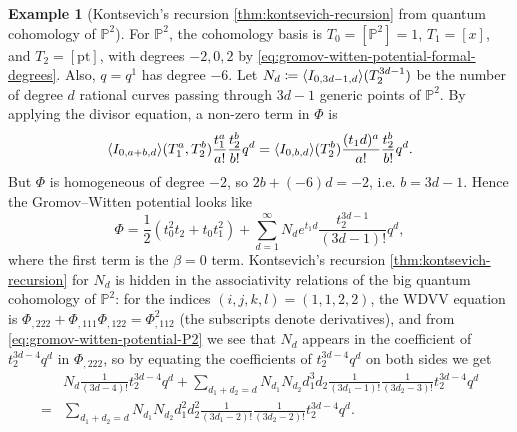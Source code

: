 \documentclass{report}
\theoremstyle{plain}
\theoremstyle{definition}
\newtheorem{example}[theorem]{Example}
\theoremstyle{remark}
\newcommand{\bP}{\mathbb{P}}
\newcommand{\pt}{\mathrm{pt}}
\DeclarePairedDelimiter{\inner}{\langle}{\rangle}
\begin{document}
\begin{example}[Kontsevich's recursion \ref{thm:kontsevich-recursion} from quantum cohomology of $\bP^2$]
  For $\bP^2$, the cohomology basis is $T_0 = [\bP^2] = 1$, $T_1 =
  [x]$, and $T_2 = [\pt]$, with degrees $-2, 0, 2$ by
  \eqref{eq:gromov-witten-potential-formal-degrees}. Also, $q = q^1$
  has degree $-6$. Let $N_d \coloneqq
  \inner{I_{0,3d-1,d}}(T_2^{3d-1})$ be the number of degree $d$
  rational curves passing through $3d-1$ generic points of $\bP^2$. By
  applying the divisor equation, a non-zero term in $\Phi$ is
  \[ \inner{I_{0,a+b,d}}(T_1^a, T_2^b) \frac{t_1^a}{a!} \frac{t_2^b}{b!} q^d = \inner{I_{0,b,d}}(T_2^b) \frac{(t_1d)^a}{a!} \frac{t_2^b}{b!} q^d. \]
  But $\Phi$ is homogeneous of degree $-2$, so $2b + (-6)d = -2$, i.e.
  $b = 3d-1$. Hence the Gromov--Witten potential looks like
  \begin{equation} \label{eq:gromov-witten-potential-P2}
    \Phi = \frac{1}{2}(t_0^2 t_2 + t_0t_1^2) + \sum_{d=1}^\infty N_d e^{t_1d} \frac{t_2^{3d-1}}{(3d-1)!} q^d,
  \end{equation}
  where the first term is the $\beta=0$ term. Kontsevich's recursion
  \ref{thm:kontsevich-recursion} for $N_d$ is hidden in the
  associativity relations of the big quantum cohomology of $\bP^2$:
  for the indices $(i,j,k,l) = (1,1,2,2)$, the WDVV equation is
  $\Phi_{,222} + \Phi_{,111}\Phi_{,122} = \Phi_{,112}^2$ (the
  subscripts denote derivatives), and from
  \eqref{eq:gromov-witten-potential-P2} we see that $N_d$ appears in
  the coefficient of $t_2^{3d-4}q^d$ in $\Phi_{,222}$, so by equating
  the coefficients of $t_2^{3d-4}q^d$ on both sides we get
  \begin{align*}
    &N_d \frac{1}{(3d-4)!} t_2^{3d-4} q^d + \sum_{d_1+d_2=d} N_{d_1}N_{d_2} d_1^3d_2 \frac{1}{(3d_1-1)!} \frac{1}{(3d_2-3)!} t_2^{3d-4} q^d \\
    = &\sum_{d_1+d_2=d} N_{d_1} N_{d_2} d_1^2 d_2^2 \frac{1}{(3d_1-2)!} \frac{1}{(3d_2-2)!} t_2^{3d-4} q^d.
  \end{align*}
\end{example}



\todos



\end{document}
